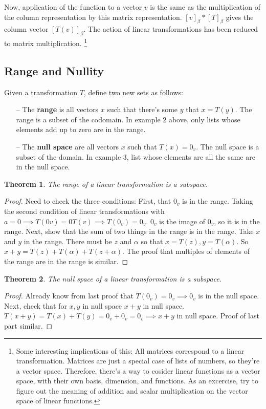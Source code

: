 \documentclass{article}
\newtheorem*{theorem}{Theorem}
\begin{document}
            Now, application of the function to a vector $v$ is the same as the multiplication of the column representation by this matrix representation. $[v]_\beta * [T]_\beta$ gives the column vector $[T(v)]_\beta$. The action of linear transformations has been reduced to matrix multiplication.
            \footnote{Some interesting implications of this: All matrices correspond to a linear transformation. Matrices are just a special case of lists of numbers, so they're a vector space. Therefore, there's a way to cosider linear functions as a vector space, with their own basis, dimension, and functions. As an excercise, try to figure out the meaning of addition and scalar multiplication on the vector space of linear functions.}

        \subsection{Range and Nullity}
            Given a transformation $T$, define two new sets as follows: 
            \begin{itemize}
                \item[--]  The \textbf{range} is all vectors $x$ such that there's some $y$ that $x = T(y)$. The range is a subset of the codomain. In example 2 above, only lists whose elements add up to zero are in the range.

                \item[--] The \textbf{null space} are all vectors $x$ such that $T(x) = 0_v$. The null space is a subset of the domain. In example 3, list whose elements are all the same are in the null space.
            \end{itemize}
            \begin{theorem}
                The range of a linear transformation is a subspace.
            \end{theorem}
            \begin{proof}
                Need to check the three conditions: First, that $0_v$ is in the range. Taking the second condition of linear transformations with $a = 0 \implies T(0v) = 0T(v) \implies T(0_v) = 0_v$. $0_v$ is the image of $0_v$, so it is in the range. Next, show that the sum of two things in the range is in the range. Take $x$ and $y$ in the range. There must be $z$ and $\alpha$ so that $x = T(z), y = T(\alpha)$. So $x + y = T(z) + T(\alpha) + T(z + \alpha)$. The proof that multiples of elements of the range are in the range is similar.
            \end{proof}
            \begin{theorem}
                The null space of a linear transformation is a subspace.
            \end{theorem}
            \begin{proof}
                Already know from last proof that $T(0_v) = 0_v \implies 0_v$ is in the null space. Next, check that for $x, y$ in null space $x + y$ in null space. $T(x + y) = T(x) + T(y) = 0_v + 0_v = 0_v \implies x + y$ in null space. Proof of last part similar.
            \end{proof}
\end{document}
